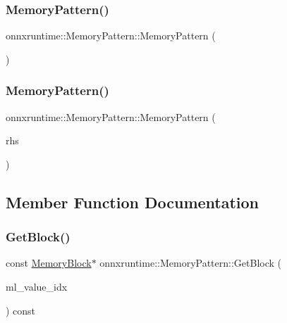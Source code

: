 \subsubsection{\texorpdfstring{Memory\+Pattern()}{MemoryPattern()}\hspace{0.1cm}{\footnotesize\ttfamily [1/2]}}
{\footnotesize\ttfamily onnxruntime\+::\+Memory\+Pattern\+::\+Memory\+Pattern (\begin{DoxyParamCaption}{ }\end{DoxyParamCaption})\hspace{0.3cm}{\ttfamily [default]}}

\mbox{\label{classonnxruntime_1_1MemoryPattern_af15769f849757f058bf01621126e9d1d}} 
\subsubsection{\texorpdfstring{Memory\+Pattern()}{MemoryPattern()}\hspace{0.1cm}{\footnotesize\ttfamily [2/2]}}
{\footnotesize\ttfamily onnxruntime\+::\+Memory\+Pattern\+::\+Memory\+Pattern (\begin{DoxyParamCaption}\item[{\mbox{\hyperlink{classonnxruntime_1_1MemoryPattern}{Memory\+Pattern}} \&\&}]{rhs }\end{DoxyParamCaption})\hspace{0.3cm}{\ttfamily [inline]}}



\subsection{Member Function Documentation}
\mbox{\label{classonnxruntime_1_1MemoryPattern_a98a28a361c9db40e72e4cf8479738032}} 
\subsubsection{\texorpdfstring{Get\+Block()}{GetBlock()}}
{\footnotesize\ttfamily const \mbox{\hyperlink{structonnxruntime_1_1MemoryBlock}{Memory\+Block}}$\ast$ onnxruntime\+::\+Memory\+Pattern\+::\+Get\+Block (\begin{DoxyParamCaption}\item[{int}]{ml\+\_\+value\+\_\+idx }\end{DoxyParamCaption}) const\hspace{0.3cm}{\ttfamily [inline]}}

